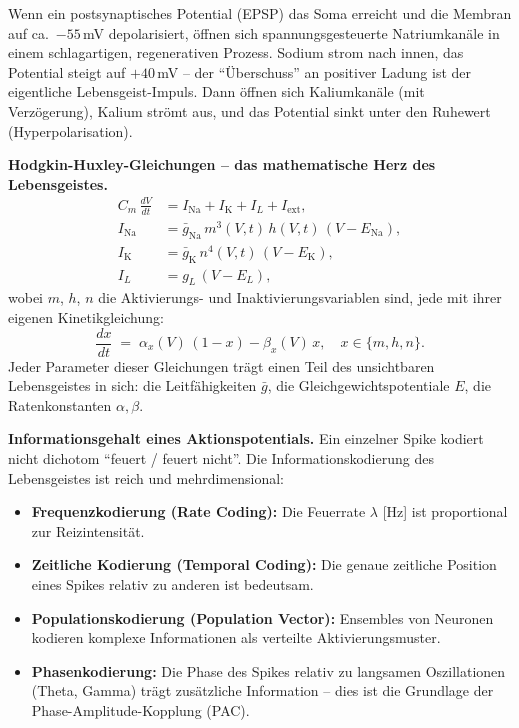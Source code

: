﻿\documentclass[12pt,a4paper]{report}
\theoremstyle{plain}
\theoremstyle{definition}
\theoremstyle{remark}
\begin{document}
	Wenn ein postsynaptisches Potential (EPSP) das Soma erreicht und die
	Membran auf ca.\ $-55$\,mV depolarisiert, öffnen sich
	spannungsgesteuerte Natriumkanäle in einem schlagartigen, regenerativen
	Prozess. Sodium strom nach innen, das Potential steigt auf $+40$\,mV --
	der ``Überschuss'' an positiver Ladung ist der eigentliche Lebensgeist-Impuls.
	Dann öffnen sich Kaliumkanäle (mit Verzögerung), Kalium strömt aus,
	und das Potential sinkt unter den Ruhewert (Hyperpolarisation).
	
	\textbf{Hodgkin-Huxley-Gleichungen -- das mathematische Herz des Lebensgeistes.}
	\begin{align}
		C_m\,\frac{dV}{dt} &= I_{\mathrm{Na}} + I_{\mathrm{K}} + I_L + I_{\mathrm{ext}},\\[6pt]
		I_{\mathrm{Na}} &= \bar{g}_{\mathrm{Na}}\,m^3(V,t)\,h(V,t)\,(V - E_{\mathrm{Na}}),\\[4pt]
		I_{\mathrm{K}}  &= \bar{g}_{\mathrm{K}} \,n^4(V,t)\,(V - E_{\mathrm{K}}),\\[4pt]
		I_L             &= g_L\,(V - E_L),
	\end{align}
	wobei $m$, $h$, $n$ die Aktivierungs- und Inaktivierungsvariablen sind,
	jede mit ihrer eigenen Kinetikgleichung:
	\[
	\frac{dx}{dt} \;=\; \alpha_x(V)\,(1-x) - \beta_x(V)\,x,
	\quad x \in \{m, h, n\}.
	\]
	Jeder Parameter dieser Gleichungen trägt einen Teil des
	unsichtbaren Lebensgeistes in sich: die Leitfähigkeiten $\bar{g}$,
	die Gleichgewichtspotentiale $E$, die Ratenkonstanten $\alpha, \beta$.
	
	\textbf{Informationsgehalt eines Aktionspotentials.}
	Ein einzelner Spike kodiert nicht dichotom ``feuert / feuert nicht''.
	Die Informationskodierung des Lebensgeistes ist reich und mehrdimensional:
	\begin{itemize}
		\item \textbf{Frequenzkodierung (Rate Coding):} Die Feuerrate
		$\lambda$ [Hz] ist proportional zur Reizintensität.
		\item \textbf{Zeitliche Kodierung (Temporal Coding):} Die genaue
		zeitliche Position eines Spikes relativ zu anderen ist bedeutsam.
		\item \textbf{Populationskodierung (Population Vector):} Ensembles
		von Neuronen kodieren komplexe Informationen als verteilte
		Aktivierungsmuster.
		\item \textbf{Phasenkodierung:} Die Phase des Spikes relativ zu
		langsamen Oszillationen (Theta, Gamma) trägt zusätzliche
		Information -- dies ist die Grundlage der
		Phase-Ampli\-tude-Kopplung (PAC).
	\end{itemize}
	
\end{document}
